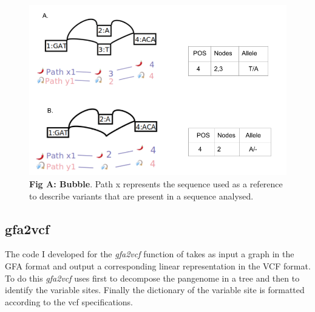 
\begin{figure}[H]
\centering
\includegraphics[width=1.00\textwidth]{fig/bubblesimpleandcomplex.png}
\decoRule
\caption{\textbf{Fig A: Bubble}. Path x represents the sequence used as a reference to describe variants that are present in a sequence analysed.} 
\label{fig:bubble.png}
\end{figure}




\setcounter{secnumdepth}{3}
\subsection{gfa2vcf}
The code I developed for the \textit{gfa2vcf} function of \vgp takes as input a graph in the GFA format and output a corresponding linear representation in the VCF format. To do this \textit{gfa2vcf} uses first \bbp to decompose the pangenome in a tree and then \bbc to identify the variable sites. Finally the dictionary of the variable site is formatted according to the vcf specifications. 

